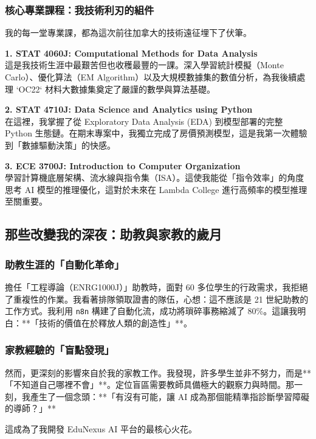 \documentclass[12pt,a4paper]{article}
\begin{document}
\newpage

\subsubsection{核心專業課程：我技術利刃的組件}
我的每一堂專業課，都為這次前往加拿大的技術遠征埋下了伏筆。

\textbf{1. STAT 4060J: Computational Methods for Data Analysis} \\
這是我技術生涯中最艱苦但也收穫最豐的一課。深入學習統計模擬（Monte Carlo）、優化算法（EM Algorithm）以及大規模數據集的數值分析，為我後續處理 `OC22` 材料大數據集奠定了嚴謹的數學與算法基礎。

\textbf{2. STAT 4710J: Data Science and Analytics using Python} \\
在這裡，我掌握了從 Exploratory Data Analysis (EDA) 到模型部署的完整 Python 生態鏈。在期末專案中，我獨立完成了房價預測模型，這是我第一次體驗到「數據驅動決策」的快感。

\textbf{3. ECE 3700J: Introduction to Computer Organization} \\
學習計算機底層架構、流水線與指令集（ISA）。這使我能從「指令效率」的角度思考 AI 模型的推理優化，這對於未來在 Lambda College 進行高頻率的模型推理至關重要。

\newpage

\subsection{那些改變我的深夜：助教與家教的歲月}

\subsubsection{助教生涯的「自動化革命」}
擔任「工程導論（ENRG1000J）」助教時，面對 60 多位學生的行政需求，我拒絕了重複性的作業。我看著排隊領取證書的隊伍，心想：這不應該是 21 世紀助教的工作方式。我利用 \texttt{n8n} 構建了自動化流，成功將瑣碎事務縮減了 80\%。這讓我明白：**「技術的價值在於釋放人類的創造性」**。

\subsubsection{家教經驗的「盲點發現」}
然而，更深刻的影響來自於我的家教工作。我發現，許多學生並非不努力，而是**「不知道自己哪裡不會」**。定位盲區需要教師具備極大的觀察力與時間。那一刻，我產生了一個念頭：**「有沒有可能，讓 AI 成為那個能精準指診斷學習障礙的導師？」**

這成為了我開發 EduNexus AI 平台的最核心火花。
\end{document}
